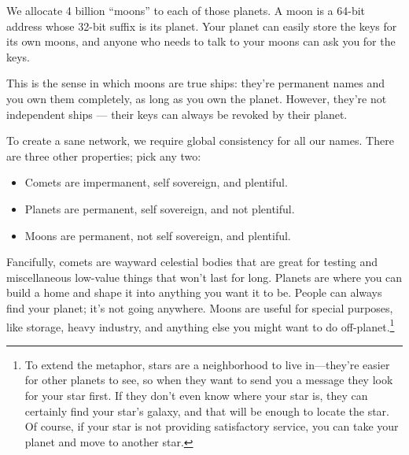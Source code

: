 \documentclass[twoside]{article}
\begin{document}
We allocate 4 billion ``moons'' to each of those planets. A moon is a
64-bit address whose 32-bit suffix is its planet. Your planet can easily
store the keys for its own moons, and anyone who needs to talk to your
moons can ask you for the keys.

This is the sense in which moons are true ships: they're permanent names
and you own them completely, as long as you own the planet. However,
they're not independent ships --- their keys can always be revoked by
their planet.

To create a sane network, we require global consistency for all our
names. There are three other properties; pick any two:

\begin{itemize}
\item
  Comets are impermanent, self sovereign, and plentiful.
\item
  Planets are permanent, self sovereign, and not plentiful.
\item
  Moons are permanent, not self sovereign, and plentiful.
\end{itemize}

Fancifully, comets are wayward celestial bodies that are great for
testing and miscellaneous low-value things that won't last for long.
Planets are where you can build a home and shape it into anything you
want it to be. People can always find your planet; it's not going
anywhere. Moons are useful for special purposes, like storage, heavy
industry, and anything else you might want to do
off-planet.\footnote{To extend the metaphor, stars are a neighborhood to live in—they're
easier for other planets to see, so when they want to send you a
message they look for your star first. If they don't even know where
your star is, they can certainly find your star's galaxy, and that
will be enough to locate the star. Of course, if your star is not
providing satisfactory service, you can take your planet and move to
another star.}

\printbibliography
\end{document}
